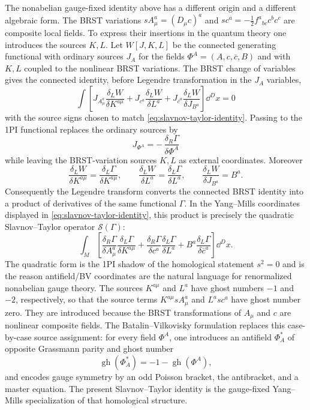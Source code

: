 The nonabelian gauge-fixed identity above has a different origin and a
different algebraic form.  The BRST variations \(sA_\mu^a=(D_\mu c)^a\) and
\(sc^a=-\frac12 f^a{}_{bc}c^b c^c\) are composite local fields.  To express
their insertions in the quantum theory one introduces the sources \(K,L\).
Let \(W[J,K,L]\) be the connected generating functional with ordinary sources
\(J_A\) for the fields \(\Phi^A=(A,c,\bar c,B)\) and with \(K,L\) coupled to
the nonlinear BRST variations.  The BRST change of variables gives the
connected identity, before Legendre transformation in the \(J_A\) variables,
\[
  \int
  \left[
    J_{A_\mu^a}\frac{\delta_LW}{\delta K^{a\mu}}
    +
    J_{c^a}\frac{\delta_LW}{\delta L^a}
    +
    J_{\bar c^a}\frac{\delta_LW}{\delta J_{B^a}}
  \right]\dd^D x
  =
  0
\]
with the source signs chosen to match \eqref{eq:slavnov-taylor-identity}.
Passing to the 1PI functional replaces the ordinary sources by
\[
  J_{\Phi^A}
  =
  -\,\frac{\delta_R\Gamma}{\delta\Phi^A}
\]
while leaving the BRST-variation sources \(K,L\) as external coordinates.
Moreover
\[
  \frac{\delta_LW}{\delta K^{a\mu}}
  =
  \frac{\delta_L\Gamma}{\delta K^{a\mu}},
  \qquad
  \frac{\delta_LW}{\delta L^a}
  =
  \frac{\delta_L\Gamma}{\delta L^a},
  \qquad
  \frac{\delta_LW}{\delta J_{B^a}}=B^a .
\]
Consequently the Legendre transform converts the connected BRST identity
into a product of derivatives of the same functional \(\Gamma\).  In the
Yang--Mills coordinates displayed in \eqref{eq:slavnov-taylor-identity}, this
product is precisely the quadratic Slavnov--Taylor operator
\(\mathcal S(\Gamma)\):
\[
  \int_M
  \left[
  \frac{\delta_R\Gamma}{\delta A_\mu^a}
  \frac{\delta_L\Gamma}{\delta K^{a\mu}}
  +
  \frac{\delta_R\Gamma}{\delta c^a}
  \frac{\delta_L\Gamma}{\delta L^a}
  +
  B^a\frac{\delta_L\Gamma}{\delta\bar c^a}
  \right]\dd^D x .
\]
The quadratic form is the 1PI shadow of the homological statement \(s^2=0\)
and is the reason antifield/BV coordinates are the natural language for
renormalized nonabelian gauge theory.
The sources \(K^{a\mu}\) and \(L^a\) have ghost numbers \(-1\) and \(-2\),
respectively, so that the source terms \(K^{a\mu}sA^a_\mu\) and \(L^a sc^a\)
have ghost number zero.  They are introduced because the BRST transformations
of \(A_\mu\) and \(c\) are nonlinear composite fields.  The
Batalin--Vilkovisky formulation replaces this case-by-case source assignment:
for every field \(\Phi^A\), one introduces an antifield \(\Phi^*_A\) of
opposite Grassmann parity and ghost number
\[
  \operatorname{gh}(\Phi^*_A)=-1-\operatorname{gh}(\Phi^A),
\]
and encodes gauge symmetry by an odd Poisson bracket, the antibracket, and a
master equation.  The present Slavnov--Taylor identity is the gauge-fixed
Yang--Mills specialization of that homological structure.

